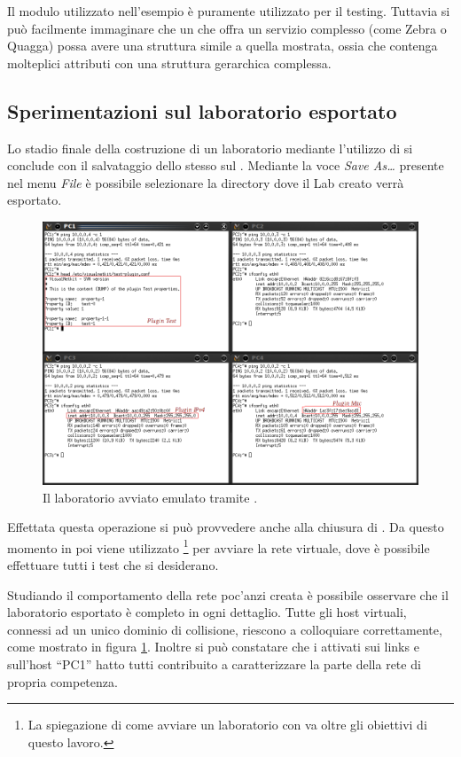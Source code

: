 Il modulo utilizzato nell'esempio è puramente utilizzato per il testing. Tuttavia si può facilmente immaginare che un \plugin{} che offra un servizio complesso (come Zebra o Quagga) possa avere una struttura simile a quella mostrata, ossia che contenga molteplici attributi con una struttura gerarchica complessa.

\subsection{Sperimentazioni sul laboratorio esportato}
Lo stadio finale della costruzione di un laboratorio mediante l'utilizzo di \visualnetkit{} si conclude con il salvataggio dello stesso sul \fs{}. Mediante la voce \emph{Save As\ldots} presente nel menu \emph{File} è possibile selezionare la directory dove il Lab creato verrà esportato.

\begin{figure}[!htb]
	\centering
	\includegraphics[width=13cm]{images/netkit_lab_example.png}
	\caption{Il laboratorio avviato emulato tramite \netkit{}.}
	\label{figura:ex_netkit}
\end{figure}

Effettata questa operazione si può provvedere anche alla chiusura di \visualnetkit{}. Da questo momento in poi viene utilizzato \netkit{}\footnote{La spiegazione di come avviare un laboratorio con \netkit{} va oltre gli obiettivi di questo lavoro.} per avviare la rete virtuale, dove è possibile effettuare tutti i test che si desiderano.

Studiando il comportamento della rete poc'anzi creata è possibile osservare che il laboratorio esportato è completo in ogni dettaglio. Tutte gli host virtuali, connessi ad un unico dominio di collisione, riescono a colloquiare correttamente, come mostrato in figura \ref{figura:ex_netkit}. Inoltre si può constatare che i \plugin{} attivati sui links e sull'host ``PC1'' hatto tutti contribuito a caratterizzare la parte della rete di propria competenza.
